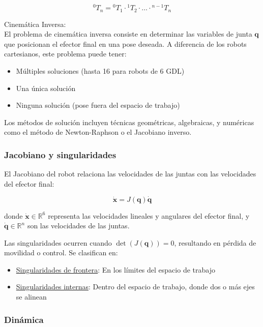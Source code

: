 \begin{equation}
{}^0T_n = {}^0T_1 \cdot {}^1T_2 \cdot \ldots \cdot {}^{n-1}T_n
\end{equation}

Cinemática Inversa:\\
\noindent
El problema de cinemática inversa consiste en determinar las variables de junta $\mathbf{q}$ que posicionan el efector final en una pose deseada. A diferencia de los robots cartesianos, este problema puede tener:

\begin{itemize}[label=$\bullet$]
    \item Múltiples soluciones (hasta 16 para robots de 6 GDL)
    \item Una única solución
    \item Ninguna solución (pose fuera del espacio de trabajo)
\end{itemize}

Los métodos de solución incluyen técnicas geométricas, algebraicas, y numéricas como el método de Newton-Raphson o el Jacobiano inverso.

\subsubsection{Jacobiano y singularidades}

El Jacobiano del robot relaciona las velocidades de las juntas con las velocidades del efector final:

\begin{equation}
\dot{\mathbf{x}} = J(\mathbf{q}) \dot{\mathbf{q}}
\end{equation}

donde $\dot{\mathbf{x}} \in \mathbb{R}^6$ representa las velocidades lineales y angulares del efector final, y $\dot{\mathbf{q}} \in \mathbb{R}^n$ son las velocidades de las juntas.

Las singularidades ocurren cuando $\det(J(\mathbf{q})) = 0$, resultando en pérdida de movilidad o control. Se clasifican en:

\begin{itemize}[label=$\bullet$]
    \item \underline{Singularidades de frontera}: En los límites del espacio de trabajo
    \item \underline{Singularidades internas}: Dentro del espacio de trabajo, donde dos o más ejes se alinean
\end{itemize}

\subsubsection{Dinámica}

